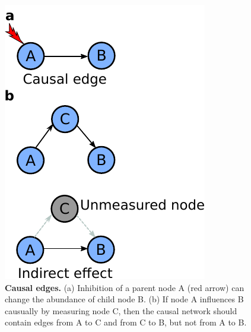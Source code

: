 \begin{figure}
\begin{minipage}{0.4\linewidth}
\includegraphics{./Bilder/causaledges.pdf}
\end{minipage}
\caption[Causal edges]{\textbf{Causal edges.} (a) Inhibition of a parent node A (red arrow) can change the abundance of child node B. (b) If node A influences B causually by measuring node C, then the causal network should contain edges from A to C and from C to B, but not from A to B. }
\label{fig:7}
\end{figure}




